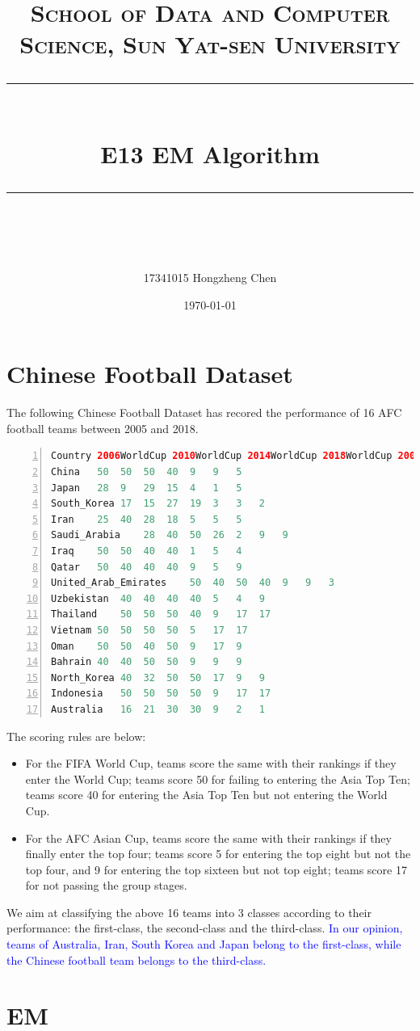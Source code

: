 ﻿\documentclass[a4paper, 11pt]{article}
\title{
\normalfont \normalsize
\textsc{School of Data and Computer Science, Sun Yat-sen University} \\ [25pt] %
\rule{\textwidth}{0.5pt} \\[0.4cm] %
\huge  E13 EM Algorithm\\ %
\rule{\textwidth}{2pt} \\[0.5cm] %
\author{17341015 Hongzheng Chen}
\date{\normalsize\today}
}
\numberwithin{equation}{subsection}
\begin{document}
\maketitle
\tableofcontents
\newpage
\section{Chinese Football Dataset}
The following Chinese Football Dataset has recored the performance of 16 AFC football teams between 2005 and 2018.
\begin{lstlisting}[language={Java},
	frame=shadowbox,
	breaklines=true,
	numbers=left,
	basicstyle=\footnotesize]
Country	2006WorldCup 2010WorldCup 2014WorldCup 2018WorldCup 2007AsianCup 2011AsianCup 2015AsianCup
China	50	50	50	40	9	9	5
Japan	28	9	29	15	4	1	5
South_Korea	17	15	27	19	3	3	2
Iran	25	40	28	18	5	5	5
Saudi_Arabia	28	40	50	26	2	9	9
Iraq	50	50	40	40	1	5	4
Qatar	50	40	40	40	9	5	9
United_Arab_Emirates	50	40	50	40	9	9	3
Uzbekistan	40	40	40	40	5	4	9
Thailand	50	50	50	40	9	17	17
Vietnam	50	50	50	50	5	17	17
Oman	50	50	40	50	9	17	9
Bahrain	40	40	50	50	9	9	9
North_Korea	40	32	50	50	17	9	9
Indonesia	50	50	50	50	9	17	17
Australia	16	21	30	30	9	2	1
\end{lstlisting}

The scoring rules are below:
\begin{itemize}
	\item For the FIFA World Cup, teams score the same with their rankings if they enter the World Cup; teams score 50 for failing to entering the Asia Top Ten; teams score 40 for entering the Asia Top Ten but not entering the World Cup.
	\item For the AFC Asian Cup, teams score the same with their rankings if they finally enter the top four; teams score 5 for entering the top eight but not the top four, and 9 for entering the top sixteen but not top eight; teams score 17 for not passing the group stages.
\end{itemize}

We aim at classifying the above 16 teams into 3 classes according to their performance: the first-class, the second-class and the third-class. \textcolor{blue}{In our opinion, teams of Australia, Iran, South Korea and Japan belong to the first-class, while the Chinese football team belongs to the third-class.}



\section{EM}
\end{document}
